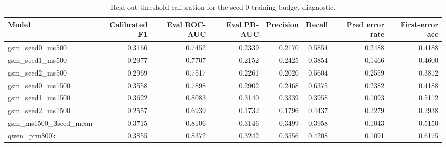 \begin{table}[t]
\centering
\small
\begin{tabular}{lrrrrrrr}
\toprule
Model & Calibrated F1 & Eval ROC-AUC & Eval PR-AUC & Precision & Recall & Pred error rate & First-error acc \\
\midrule
gsm\_seed0\_ms500 & 0.3166 & 0.7452 & 0.2339 & 0.2170 & 0.5854 & 0.2488 & 0.4188 \\
gsm\_seed1\_ms500 & 0.2977 & 0.7707 & 0.2152 & 0.2425 & 0.3854 & 0.1466 & 0.4600 \\
gsm\_seed2\_ms500 & 0.2969 & 0.7517 & 0.2261 & 0.2020 & 0.5604 & 0.2559 & 0.3812 \\
gsm\_seed0\_ms1500 & 0.3558 & 0.7898 & 0.2902 & 0.2468 & 0.6375 & 0.2382 & 0.4188 \\
gsm\_seed1\_ms1500 & 0.3622 & 0.8083 & 0.3140 & 0.3339 & 0.3958 & 0.1093 & 0.5112 \\
gsm\_seed2\_ms1500 & 0.2557 & 0.6939 & 0.1732 & 0.1796 & 0.4437 & 0.2279 & 0.2938 \\
gsm\_ms1500\_3seed\_mean & 0.3715 & 0.8106 & 0.3146 & 0.3499 & 0.3958 & 0.1043 & 0.5150 \\
qwen\_prm800k & 0.3855 & 0.8372 & 0.3242 & 0.3556 & 0.4208 & 0.1091 & 0.6175 \\
\bottomrule
\end{tabular}
\caption{Held-out threshold calibration for the seed-0 training-budget diagnostic.}
\label{tab:phase-b-training-budget-calibrated}
\end{table}

